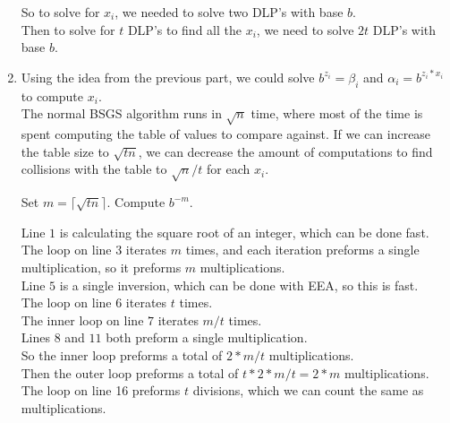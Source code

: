 \documentclass{assignment}
\begin{document}
\begin{problemlist}
\begin{problem}
\begin{enumerate}
    So to solve for $x_i$, we needed to solve two DLP's with base $b$.\\
    Then to solve for $t$ DLP's to find all the $x_i$, we need to solve $2t$ DLP's with base $b$.\\
  \item
    Using the idea from the previous part, we could solve $b^{z_i}=\beta_i$ and $\alpha_i=b^{z_i*x_i}$ to compute $x_i$.\\
    The normal BSGS algorithm runs in $\sqrt{n}$ time, where most of the time is spent computing the table of values to compare against. If we can increase the table size to $\sqrt{tn}$, we can decrease the amount of computations to find collisions with the table to $\sqrt{n}/t$ for each $x_i$.\\

    \begin{algorithm}[H]
      \begin{algorithmic}[1]
        \STATE Set $m=\lceil \sqrt{tn} \rceil$.
        \ENDFOR
        \STATE Compute $b^{-m}$.
        \ENDIF
        \ENDIF
        \ENDFOR
        \ENDFOR
        \ENDFOR
        \end{algorithmic}
    \end{algorithm}

    Line $1$ is calculating the square root of an integer, which can be done fast.\\
    The loop on line $3$ iterates $m$ times, and each iteration preforms a single multiplication, so it preforms $m$ multiplications.\\
    Line $5$ is a single inversion, which can be done with EEA, so this is fast.\\
    The loop on line $6$ iterates $t$ times.\\
    The inner loop on line $7$ iterates $m/t$ times.\\
    Lines $8$ and $11$ both preform a single multiplication.\\
    So the inner loop preforms a total of $2*m/t$ multiplications.\\
    Then the outer loop preforms a total of $t*2*m/t=2*m$ multiplications.\\
    The loop on line 16 preforms $t$ divisions, which we can count the same as multiplications.\\


\end{enumerate}
\end{problem}
\end{problemlist}
\end{document}
